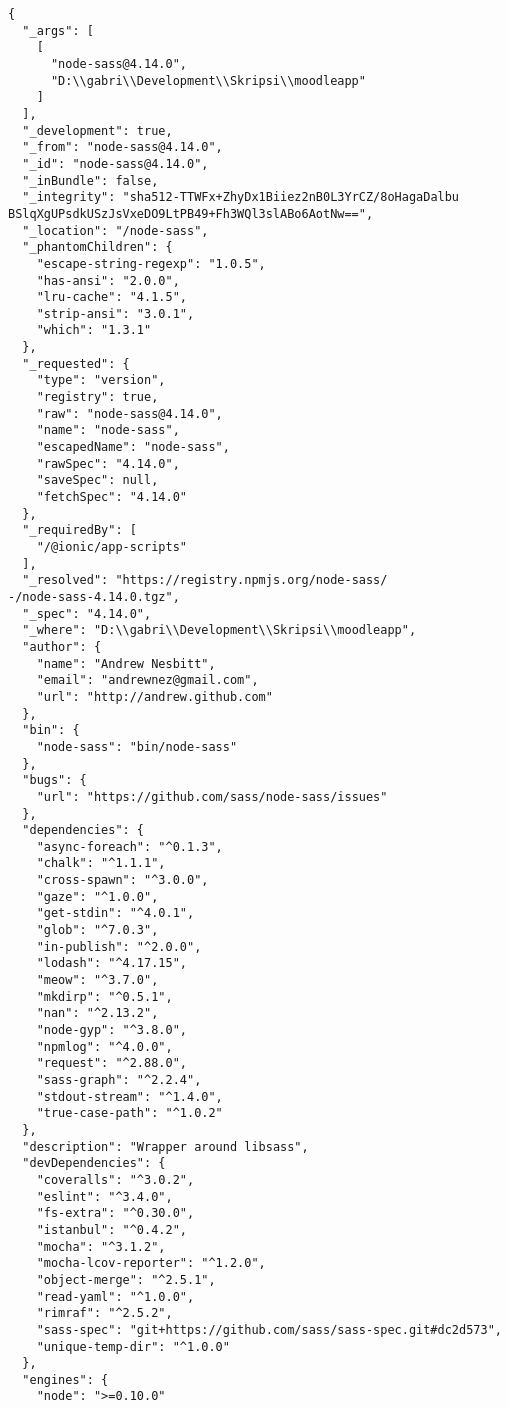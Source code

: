 \begin{lstlisting}[frame=single, label ={node:sass version}, caption = Perubahan versi node-sass pada \texttt{package-lock.json} ]
	{
  "_args": [
    [
      "node-sass@4.14.0",
      "D:\\gabri\\Development\\Skripsi\\moodleapp"
    ]
  ],
  "_development": true,
  "_from": "node-sass@4.14.0",
  "_id": "node-sass@4.14.0",
  "_inBundle": false,
  "_integrity": "sha512-TTWFx+ZhyDx1Biiez2nB0L3YrCZ/8oHagaDalbu
BSlqXgUPsdkUSzJsVxeDO9LtPB49+Fh3WQl3slABo6AotNw==",
  "_location": "/node-sass",
  "_phantomChildren": {
    "escape-string-regexp": "1.0.5",
    "has-ansi": "2.0.0",
    "lru-cache": "4.1.5",
    "strip-ansi": "3.0.1",
    "which": "1.3.1"
  },
  "_requested": {
    "type": "version",
    "registry": true,
    "raw": "node-sass@4.14.0",
    "name": "node-sass",
    "escapedName": "node-sass",
    "rawSpec": "4.14.0",
    "saveSpec": null,
    "fetchSpec": "4.14.0"
  },
  "_requiredBy": [
    "/@ionic/app-scripts"
  ],
  "_resolved": "https://registry.npmjs.org/node-sass/
-/node-sass-4.14.0.tgz",
  "_spec": "4.14.0",
  "_where": "D:\\gabri\\Development\\Skripsi\\moodleapp",
  "author": {
    "name": "Andrew Nesbitt",
    "email": "andrewnez@gmail.com",
    "url": "http://andrew.github.com"
  },
  "bin": {
    "node-sass": "bin/node-sass"
  },
  "bugs": {
    "url": "https://github.com/sass/node-sass/issues"
  },
  "dependencies": {
    "async-foreach": "^0.1.3",
    "chalk": "^1.1.1",
    "cross-spawn": "^3.0.0",
    "gaze": "^1.0.0",
    "get-stdin": "^4.0.1",
    "glob": "^7.0.3",
    "in-publish": "^2.0.0",
    "lodash": "^4.17.15",
    "meow": "^3.7.0",
    "mkdirp": "^0.5.1",
    "nan": "^2.13.2",
    "node-gyp": "^3.8.0",
    "npmlog": "^4.0.0",
    "request": "^2.88.0",
    "sass-graph": "^2.2.4",
    "stdout-stream": "^1.4.0",
    "true-case-path": "^1.0.2"
  },
  "description": "Wrapper around libsass",
  "devDependencies": {
    "coveralls": "^3.0.2",
    "eslint": "^3.4.0",
    "fs-extra": "^0.30.0",
    "istanbul": "^0.4.2",
    "mocha": "^3.1.2",
    "mocha-lcov-reporter": "^1.2.0",
    "object-merge": "^2.5.1",
    "read-yaml": "^1.0.0",
    "rimraf": "^2.5.2",
    "sass-spec": "git+https://github.com/sass/sass-spec.git#dc2d573",
    "unique-temp-dir": "^1.0.0"
  },
  "engines": {
    "node": ">=0.10.0"

\end{lstlisting}
